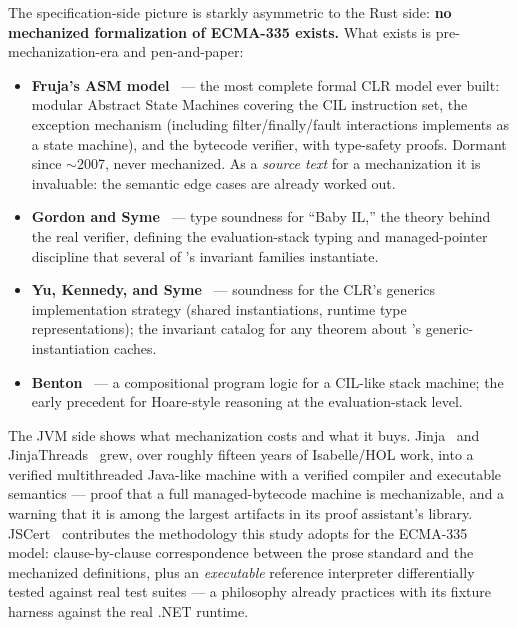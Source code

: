 The specification-side picture is starkly asymmetric to the Rust side:
\textbf{no mechanized formalization of ECMA-335 exists.} What exists is
pre-mechanization-era and pen-and-paper:

\begin{itemize}[leftmargin=1.4em]
\item \textbf{Fruja's ASM model}~\cite{fruja2006,borger2005csharp} --- the
  most complete formal CLR model ever built: modular Abstract State
  Machines covering the CIL instruction set, the exception mechanism
  (including filter/finally/fault interactions \dotnetrs{} implements as
  a state machine), and the bytecode verifier, with type-safety proofs.
  Dormant since $\sim$2007, never mechanized. As a \emph{source text} for
  a mechanization it is invaluable: the semantic edge cases are already
  worked out.
\item \textbf{Gordon and Syme}~\cite{gordonsyme2001} --- type soundness
  for ``Baby IL,'' the theory behind the real verifier, defining the
  evaluation-stack typing and managed-pointer discipline that several of
  \dotnetrs{}'s invariant families instantiate.
\item \textbf{Yu, Kennedy, and Syme}~\cite{kennedysyme2004,kennedysyme2001}
  --- soundness for the CLR's generics implementation strategy (shared
  instantiations, runtime type representations); the invariant catalog
  for any theorem about \dotnetrs{}'s generic-instantiation caches.
\item \textbf{Benton}~\cite{benton2005} --- a compositional program logic
  for a CIL-like stack machine; the early precedent for Hoare-style
  reasoning at the evaluation-stack level.
\end{itemize}

The JVM side shows what mechanization costs and what it buys.
Jinja~\cite{jinja2006} and JinjaThreads~\cite{jinjathreads2012} grew, over
roughly fifteen years of Isabelle/HOL work, into a verified multithreaded
Java-like machine with a verified compiler and executable semantics ---
proof that a full managed-bytecode machine is mechanizable, and a warning
that it is among the largest artifacts in its proof assistant's library.
JSCert~\cite{jscert2014} contributes the methodology this study adopts for
the ECMA-335 model: clause-by-clause correspondence between the prose
standard and the mechanized definitions, plus an \emph{executable}
reference interpreter differentially tested against real test suites ---
a philosophy \dotnetrs{} already practices with its fixture harness
against the real .NET runtime.

